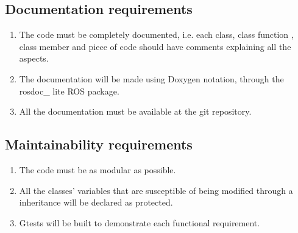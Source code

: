 \subsection{Documentation requirements}
\begin{enumerate}[label=\textbf{DR\threedigits*}]
	\item The code must be completely documented, i.e. each class, class function , class member and piece of code should have comments explaining all the aspects. 
	\item The documentation will be made using Doxygen notation, through the rosdoc\_ lite 
	ROS package. 
	\item All the documentation must be available at the git repository. 
\end{enumerate}

\subsection{Maintainability requirements}
\begin{enumerate}[label=\textbf{MR\threedigits*}]
	\item The code must be as modular as possible. 
	\item All the classes' variables that are susceptible of being modified through a inheritance will be declared as protected. 
	\item Gtests will be built to demonstrate each functional requirement. 
	
\end{enumerate}





